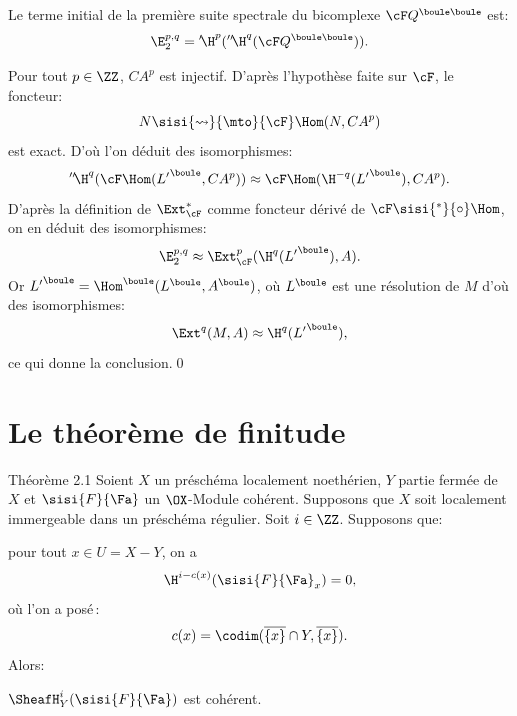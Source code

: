 Le terme initial de la premi\`ere suite spectrale du bicomplexe ${\cF}Q^{\boule\boule}$ est:
\[
\E^{p, q}_2 = {'\!\H}^p({''\!\H}^q({\cF}Q^{\boule\boule})).
\]

Pour tout $p\in\ZZ$, $CA^p$ est injectif. D'apr\`es l'hypoth\`ese faite sur ${\cF}$, le foncteur:
\[
N \sisi{\rightsquigarrow}{\mto} {\cF}\Hom(N, CA^p)\]
est exact. D'o\`u l'on d\'eduit des isomorphismes:
\[
{''\!\H}^q({\cF}\Hom({L'}^\boule, CA^p))\approx {\cF}\Hom(\H^{-q}({L'}^\boule), CA^p).
\]
D'apr\`es la d\'efinition de $\Ext^\ast_{{\cF}}$ comme foncteur d\'eriv\'e de ${\cF}{\sisi{^\ast}{\circ}}\Hom$, on en d\'eduit des isomorphismes:
\[
\E^{p, q}_2 \approx \Ext^p_{{\cF}}(\H^q({L'}^\boule), A).
\]
Or ${L'}^\boule=\Hom^\boule(L^\boule, A^\boule)$, o\`u $L^\boule$ est une r\'esolution  de $M$ d'o\`u des isomorphismes:
\[
\Ext^{q}(M, A)\approx \H^q({L'}^\boule),
\]
ce qui donne la conclusion.\qed

\section{Le th\'eor\`eme de finitude} \label{VIII.2}
\pageoriginale
{}\label{VIII.2.1}
\begin{enonce*}{Th\'eor\`eme 2.1\ndemark}
Soient $X$ un pr\'esch\'ema localement noeth\'erien, $Y$ partie ferm\'ee de $X$ et $\sisi{F}{{\Fa}}$ un $\OX$-Module coh\'erent.
Supposons que $X$ soit localement immergeable dans un pr\'esch\'ema r\'egulier. Soit $i\in\ZZ$. Supposons que:
\begin{enumeratea}
\item
pour tout $x\in U=X-Y$, on a
\[
\H^{i-c(x)}({\sisi{F}{{\Fa}}}_x)=0,
\]
o\`u l'on a pos\'e\,:
\begin{equation} \label{eq:VIII.2.1} c(x)=\codim (\overline{\{x\}}\cap Y, \overline{\{x\}}).
\end{equation}
Alors:
\item
$\SheafH^i_Y(\sisi{F}{{\Fa}})$ est coh\'erent.
\end{enumeratea}
\end{enonce*}

